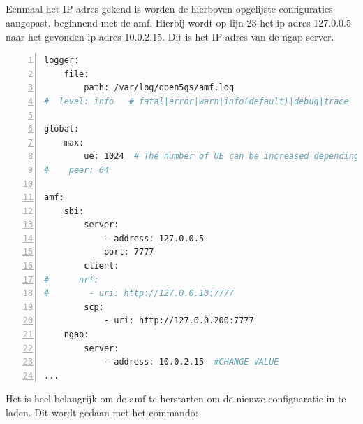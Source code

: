 \subsection{}%
\label{sec:open5gs_amf}%

Eenmaal het IP adres gekend is worden de hierboven opgelijste configuraties aangepast, beginnend met de \gls{amf}. Hierbij wordt op lijn 23 het ip adres 127.0.0.5 naar het gevonden ip adres 10.0.2.15. Dit is het IP  adres van de ngap server.

\begin{lstlisting}[basicstyle=\small, frame=single, breaklines=true, postbreak=\mbox{\textcolor{red}{$\hookrightarrow$}\space}, escapeinside ={\%,}, escapechar={!}, numbers=left, language=sh, caption=Open5GS amf configuratie]
logger:
    file:
        path: /var/log/open5gs/amf.log
#  level: info   # fatal|error|warn|info(default)|debug|trace

global:
    max:
        ue: 1024  # The number of UE can be increased depending on memory size.
#    peer: 64

amf:
    sbi:
        server:
            - address: 127.0.0.5
            port: 7777
        client:
#      nrf:
#        - uri: http://127.0.0.10:7777
        scp:
            - uri: http://127.0.0.200:7777
    ngap:
        server:
            - address: 10.0.2.15  #CHANGE VALUE
...
\end{lstlisting}

Het is heel belangrijk om de \gls{amf} te herstarten om de nieuwe configuaratie in te laden. Dit wordt gedaan met het commando: 

\subsection{}%
\label{sec:gnb_config}%

